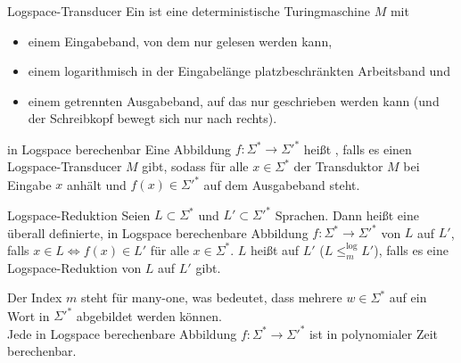 \begin{Def}{Logspace-Transducer}
    Ein 
    ist eine deterministische Turingmaschine $M$ mit
    \begin{itemize}
        \item
        einem Eingabeband, von dem nur gelesen werden kann,
        
        \item
        einem logarithmisch in der Eingabelänge platzbeschränkten Arbeitsband und
        
        \item
        einem getrennten Ausgabeband, auf das nur geschrieben werden kann
        (und der Schreibkopf bewegt sich nur nach rechts).
    \end{itemize}
\end{Def}

\begin{Def}{in Logspace berechenbar}
    Eine Abbildung $f\colon \Sigma^\ast \rightarrow \Sigma'^\ast$ heißt
    , falls es einen Logspace-Transducer $M$ gibt,
    sodass für alle $x \in \Sigma^\ast$
    der Transduktor $M$ bei Eingabe $x$ anhält und $f(x) \in \Sigma'^\ast$ auf dem Ausgabeband
    steht.
\end{Def}

\begin{Def}{Logspace-Reduktion}
    Seien $L \subset \Sigma^\ast$ und $L' \subset \Sigma'^\ast$ Sprachen.
    Dann heißt eine überall definierte, in Logspace berechenbare Abbildung
    $f\colon \Sigma^\ast \rightarrow \Sigma'^\ast$
     von $L$ auf $L'$, falls
    $x \in L \iff f(x) \in L'$ für alle $x \in \Sigma^\ast$.
    $L$ heißt auf $L'$ 
    ($L \le_m^{\log} L'$), falls es eine Logspace-Reduktion von $L$ auf $L'$ gibt.
\end{Def}

\begin{Bem}
    Der Index $m$ steht für many-one, was bedeutet, dass mehrere $w \in \Sigma^\ast$
    auf ein Wort in $\Sigma'^\ast$ abgebildet werden können.\\
    Jede in Logspace berechenbare Abbildung $f\colon \Sigma^\ast \rightarrow \Sigma'^\ast$ ist
    in polynomialer Zeit berechenbar.
\end{Bem}

\linie

